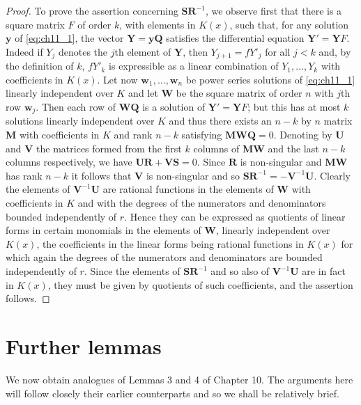 \begin{proof}
To prove the assertion concerning $\mathbf{S}\mathbf{R}^{-1}$, we observe first that there is a square matrix $F$ of order $k$, with elements in $K(x)$, such that, for any solution $\mathbf{y}$ of \eqref{eq:ch11_1}, the vector $\mathbf{Y} = \mathbf{y}\mathbf{Q}$ satisfies the differential equation $\mathbf{Y}' = \mathbf{Y}F$. Indeed if $Y_j$ denotes the $j$th element of $\mathbf{Y}$, then $Y_{j+1} = f Y'_j$ for all $j < k$ and, by the definition of $k$, $f Y'_k$ is expressible as a linear combination of $Y_1, \ldots, Y_k$ with coefficients in $K(x)$. Let now $\mathbf{w}_1, \dots, \mathbf{w}_n$ be power series solutions of \eqref{eq:ch11_1} linearly independent over $K$ and let $\mathbf{W}$ be the square matrix of order $n$ with $j$th row $\mathbf{w}_j$. Then each row of $\mathbf{W}\mathbf{Q}$ is a solution of $\mathbf{Y}' = \mathbf{Y}F$; but this has at most $k$ solutions linearly independent over $K$ and thus there exists an $n-k$ by $n$ matrix $\mathbf{M}$ with coefficients in $K$ and rank $n-k$ satisfying $\mathbf{M}\mathbf{W}\mathbf{Q} = 0$. Denoting by $\mathbf{U}$ and $\mathbf{V}$ the matrices formed from the first $k$ columns of $\mathbf{M}\mathbf{W}$ and the last $n-k$ columns respectively, we have $\mathbf{U}\mathbf{R} + \mathbf{V}\mathbf{S} = 0$. Since $\mathbf{R}$ is non-singular and $\mathbf{M}\mathbf{W}$ has rank $n-k$ it follows that $\mathbf{V}$ is non-singular and so $\mathbf{S}\mathbf{R}^{-1} = -\mathbf{V}^{-1}\mathbf{U}$. Clearly the elements of $\mathbf{V}^{-1}\mathbf{U}$ are rational functions in the elements of $\mathbf{W}$ with coefficients in $K$ and with the degrees of the numerators and denominators bounded independently of $r$. Hence they can be expressed as quotients of linear forms in certain monomials in the elements of $\mathbf{W}$, linearly independent over $K(x)$, the coefficients in the linear forms being rational functions in $K(x)$ for which again the degrees of the numerators and denominators are bounded independently of $r$. Since the elements of $\mathbf{S}\mathbf{R}^{-1}$ and so also of $\mathbf{V}^{-1}\mathbf{U}$ are in fact in $K(x)$, they must be given by quotients of such coefficients, and the assertion follows.
\end{proof}

\section{Further lemmas}\label{sec:ch11_3}

We now obtain analogues of Lemmas 3 and 4 of Chapter 10. The arguments here will follow closely their earlier counterparts and so we shall be relatively brief.

